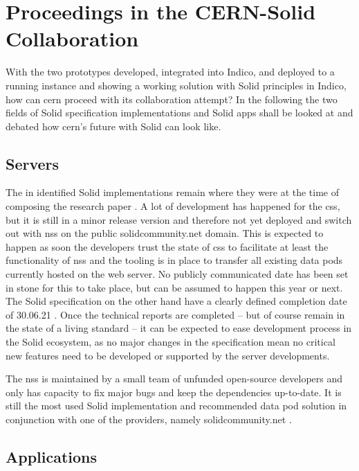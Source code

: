 \section{Proceedings in the CERN-Solid Collaboration}

With the two prototypes developed, integrated into Indico, and deployed to a running instance and showing a working solution with Solid principles in Indico, how can \gls{cern} proceed with its collaboration attempt? In the following the two fields of Solid specification implementations and Solid apps shall be looked at and debated how \gls{cern}'s future with Solid can look like.

\subsection{Servers}

The in \cite{cern-solid-investigation-spec} identified Solid implementations remain where they were at the time of composing the research paper \cite{cern-solid-investigation-spec}. A lot of development has happened for the \gls{css}, but it is still in a minor release version and therefore not yet deployed and switch out with \gls{nss} on the public solidcommunity.net domain. This is expected to happen as soon the developers trust the state of \gls{css} to facilitate at least the functionality of \gls{nss} and the tooling is in place to transfer all existing data pods currently hosted on the web server. No publicly communicated date has been set in stone for this to take place, but can be assumed to happen this year or next. The Solid specification on the other hand have a clearly defined completion date of 30.06.21 \cite{solid-tr}. Once the technical reports are completed -- but of course remain in the state of a living standard -- it can be expected to ease development process in the Solid ecosystem, as no major changes in the specification mean no critical new features need to be developed or supported by the server developments.

The \gls{nss} is maintained by a small team of unfunded open-source developers and only has capacity to fix major bugs and keep the dependencies up-to-date. It is still the most used Solid implementation and recommended data pod solution in conjunction with one of the providers, namely solidcommunity.net \cite{solid-community}.





\subsection{Applications}
